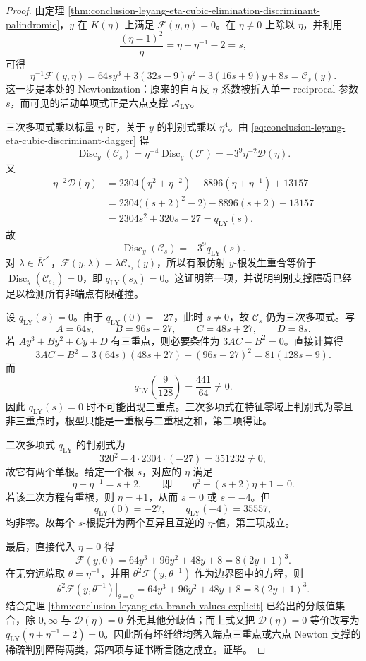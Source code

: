 \begin{proof}
由定理 \ref{thm:conclusion-leyang-eta-cubic-elimination-discriminant-palindromic}，\(y\) 在 \(K(\eta)\) 上满足 \(\mathcal F(y,\eta)=0\)。在 \(\eta\neq0\) 上除以 \(\eta\)，并利用
\[
\frac{(\eta-1)^2}{\eta}=\eta+\eta^{-1}-2=s,
\]
可得
\[
\eta^{-1}\mathcal F(y,\eta)
=64sy^3+3(32s-9)y^2+3(16s+9)y+8s
=\mathcal C_s(y).
\]
这一步是本处的 Newtonization：原来的自互反 \(\eta\)-系数被折入单一 reciprocal 参数 \(s\)，而可见的活动单项式正是六点支撑 \(\mathcal A_{\mathrm{LY}}\)。

三次多项式乘以标量 \(\eta\) 时，关于 \(y\) 的判别式乘以 \(\eta^4\)。由 \eqref{eq:conclusion-leyang-eta-cubic-discriminant-dagger} 得
\[
\operatorname{Disc}_y(\mathcal C_s)
=\eta^{-4}\operatorname{Disc}_y(\mathcal F)
=-3^9\eta^{-2}\mathscr D(\eta).
\]
又
\[
\begin{aligned}
\eta^{-2}\mathscr D(\eta)
&=2304(\eta^2+\eta^{-2})-8896(\eta+\eta^{-1})+13157\\
&=2304\bigl((s+2)^2-2\bigr)-8896(s+2)+13157\\
&=2304s^2+320s-27
=q_{\mathrm{LY}}(s).
\end{aligned}
\]
故
\[
\operatorname{Disc}_y(\mathcal C_s)=-3^9q_{\mathrm{LY}}(s).
\]
对 \(\lambda\in\overline K^\times\)，\(\mathcal F(y,\lambda)=\lambda\mathcal C_{s_\lambda}(y)\)，所以有限仿射 \(y\)-根发生重合等价于 \(\operatorname{Disc}_y(\mathcal C_{s_\lambda})=0\)，即 \(q_{\mathrm{LY}}(s_\lambda)=0\)。这证明第一项，并说明判别支撑障碍已经足以检测所有非端点有限碰撞。

设 \(q_{\mathrm{LY}}(s)=0\)。由于 \(q_{\mathrm{LY}}(0)=-27\)，此时 \(s\neq0\)，故 \(\mathcal C_s\) 仍为三次多项式。写
\[
A=64s,\qquad B=96s-27,\qquad C=48s+27,\qquad D=8s.
\]
若 \(Ay^3+By^2+Cy+D\) 有三重点，则必要条件为 \(3AC-B^2=0\)。直接计算得
\[
3AC-B^2=3(64s)(48s+27)-(96s-27)^2=81(128s-9).
\]
而
\[
q_{\mathrm{LY}}\!\left(\frac9{128}\right)=\frac{441}{64}\neq0.
\]
因此 \(q_{\mathrm{LY}}(s)=0\) 时不可能出现三重点。三次多项式在特征零域上判别式为零且非三重点时，根型只能是一重根与二重根之和，第二项得证。

二次多项式 \(q_{\mathrm{LY}}\) 的判别式为
\[
320^2-4\cdot2304\cdot(-27)=351232\neq0,
\]
故它有两个单根。给定一个根 \(s\)，对应的 \(\eta\) 满足
\[
\eta+\eta^{-1}=s+2,
\qquad\text{即}\qquad
\eta^2-(s+2)\eta+1=0.
\]
若该二次方程有重根，则 \(\eta=\pm1\)，从而 \(s=0\) 或 \(s=-4\)。但
\[
q_{\mathrm{LY}}(0)=-27,\qquad q_{\mathrm{LY}}(-4)=35557,
\]
均非零。故每个 \(s\)-根提升为两个互异且互逆的 \(\eta\)-值，第三项成立。

最后，直接代入 \(\eta=0\) 得
\[
\mathcal F(y,0)=64y^3+96y^2+48y+8=8(2y+1)^3.
\]
在无穷远端取 \(\theta=\eta^{-1}\)，并用 \(\theta^2\mathcal F(y,\theta^{-1})\) 作为边界图中的方程，则
\[
\left.\theta^2\mathcal F(y,\theta^{-1})\right|_{\theta=0}
=64y^3+96y^2+48y+8=8(2y+1)^3.
\]
结合定理 \ref{thm:conclusion-leyang-eta-branch-values-explicit} 已给出的分歧值集合，除 \(0,\infty\) 与 \(\mathscr D(\eta)=0\) 外无其他分歧值；而上式又把 \(\mathscr D(\eta)=0\) 等价改写为 \(q_{\mathrm{LY}}(\eta+\eta^{-1}-2)=0\)。因此所有坏纤维均落入端点三重点或六点 Newton 支撑的稀疏判别障碍两类，第四项与证书断言随之成立。证毕。
\end{proof}

